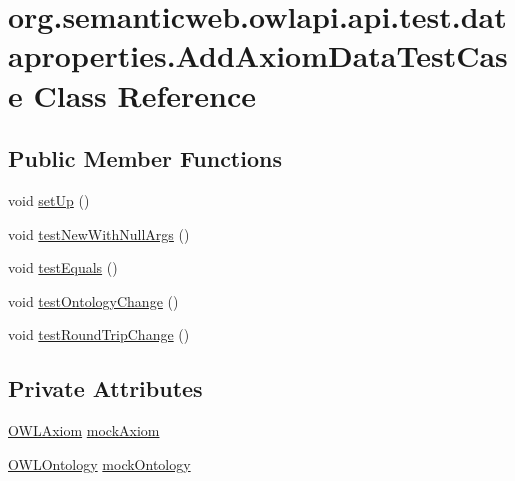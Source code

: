 \hypertarget{classorg_1_1semanticweb_1_1owlapi_1_1api_1_1test_1_1dataproperties_1_1_add_axiom_data_test_case}{\section{org.\-semanticweb.\-owlapi.\-api.\-test.\-dataproperties.\-Add\-Axiom\-Data\-Test\-Case Class Reference}
\label{classorg_1_1semanticweb_1_1owlapi_1_1api_1_1test_1_1dataproperties_1_1_add_axiom_data_test_case}
}
\subsection*{Public Member Functions}
\begin{DoxyCompactItemize}
\item 
void \hyperlink{classorg_1_1semanticweb_1_1owlapi_1_1api_1_1test_1_1dataproperties_1_1_add_axiom_data_test_case_a084e35715ac088de52428a90ba91ae18}{set\-Up} ()
\item 
void \hyperlink{classorg_1_1semanticweb_1_1owlapi_1_1api_1_1test_1_1dataproperties_1_1_add_axiom_data_test_case_a875f9498b1ac80b651d537608efd08bb}{test\-New\-With\-Null\-Args} ()
\item 
void \hyperlink{classorg_1_1semanticweb_1_1owlapi_1_1api_1_1test_1_1dataproperties_1_1_add_axiom_data_test_case_aecb9b76286827dbd5596af1aca2d7a72}{test\-Equals} ()
\item 
void \hyperlink{classorg_1_1semanticweb_1_1owlapi_1_1api_1_1test_1_1dataproperties_1_1_add_axiom_data_test_case_ad0b05887e114149e756a9e1de9c2051c}{test\-Ontology\-Change} ()
\item 
void \hyperlink{classorg_1_1semanticweb_1_1owlapi_1_1api_1_1test_1_1dataproperties_1_1_add_axiom_data_test_case_a3820c103180a1b75cc5f4f97018adae5}{test\-Round\-Trip\-Change} ()
\end{DoxyCompactItemize}
\subsection*{Private Attributes}
\begin{DoxyCompactItemize}
\item 
\hyperlink{interfaceorg_1_1semanticweb_1_1owlapi_1_1model_1_1_o_w_l_axiom}{O\-W\-L\-Axiom} \hyperlink{classorg_1_1semanticweb_1_1owlapi_1_1api_1_1test_1_1dataproperties_1_1_add_axiom_data_test_case_a1d46eb97da65b2acdc9e7cdfe233e715}{mock\-Axiom}
\item 
\hyperlink{interfaceorg_1_1semanticweb_1_1owlapi_1_1model_1_1_o_w_l_ontology}{O\-W\-L\-Ontology} \hyperlink{classorg_1_1semanticweb_1_1owlapi_1_1api_1_1test_1_1dataproperties_1_1_add_axiom_data_test_case_a95c403264d292a4df6b2940d2eba6d7a}{mock\-Ontology}
\end{DoxyCompactItemize}


